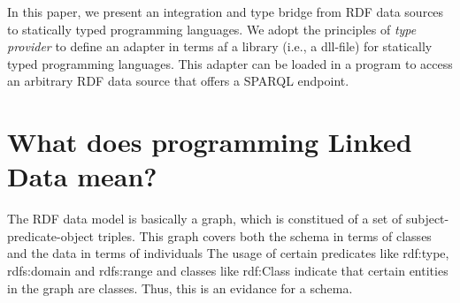 \documentclass{llncs} %
\begin{document}
%
%
%
%

In this paper, we present an integration and type bridge from RDF data sources to
statically typed programming languages. We adopt the principles of \emph{type provider}
to define an adapter in terms af a library (i.e., a dll-file) for statically typed programming languages. This adapter can
be loaded in a program to access an arbitrary RDF data source that offers a SPARQL endpoint.


\section{What does programming Linked Data mean?}
\label{sec:context}


The RDF data model is basically a graph, which is constitued of a set of subject-predicate-object triples.
This graph covers both the schema in terms of classes and the data in terms of individuals
The usage of certain predicates like \textsf{rdf:type}, \textsf{rdfs:domain} and \textsf{rdfs:range}
and classes like \textsf{rdf:Class} indicate that certain entities in the graph are classes.
Thus, this is an evidance for a schema.
\end{document}

